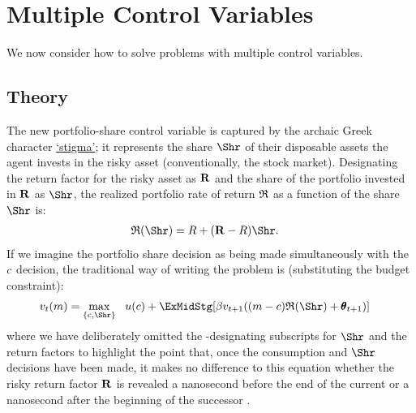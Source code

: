 \documentclass[\econtexRoot/SolvingMicroDSOPs]{subfiles}
\begin{document}
\hypertarget{multiple-control-variables}{}
\section{Multiple Control Variables}\label{sec:multiple-control-variables}
We now consider how to solve problems with multiple control variables.  

\subsection{Theory}\label{subsec:MCTheory}

The new portfolio-share control variable is captured by the archaic Greek character \href{https://en.wikipedia.org/wiki/Stigma_(ligature)}{`stigma'}; it represents the share $\Shr$ of their disposable assets the agent invests in the risky asset (conventionally, the stock market).  Designating the return factor for the risky asset as ${\mathbf{R}}$ and the share of the portfolio invested in ${\mathbf{R}}$ as $\Shr$, the realized portfolio rate of return $\mathfrak{R}$ as a function of the share $\Shr$ is:
\begin{equation}\begin{gathered}\begin{aligned}
      \Rport(\Shr) &= \Rfree+(\Risky-\Rfree)\Shr \label{eq:Shr}.
    \end{aligned}\end{gathered}\end{equation}
If we imagine the portfolio share decision as being made simultaneously with the $c$ decision, the traditional way of writing the problem is (substituting the budget constraint):
\begin{equation}\begin{gathered}\begin{aligned}
      \vFunc_{\prd}(m)  & = \max_{\{\cFunc,\Shr\}} ~~  \uFunc(c) + \ExMidStg[\DiscFac \vFunc_{\prd+1}((m-c)\Rport(\Shr) + {\TranShkEmp}_{\prd+1})] \label{eq:Bellmanundated}
    \end{aligned}\end{gathered}\end{equation}
where we have deliberately omitted the {\interval}-designating subscripts for $\Shr$ and the return factors to highlight the point that, once the consumption and $\Shr$ decisions have been made, it makes no difference to this equation whether the risky return factor ${\mathbf{R}}$ is revealed a nanosecond before the end of the current {\interval} or a nanosecond after the beginning of the successor {\interval}.
\end{document}
